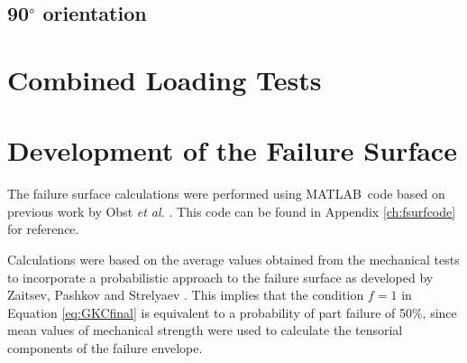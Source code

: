 \documentclass[main.tex]{subfiles}
\begin{document}
\subsection{90$^\circ$ orientation} \label{ssec:90r}
\section{Combined Loading Tests} \label{sec:clr}
\section{Development of the Failure Surface} \label{sec:fsc}

The failure surface calculations were performed using MATLAB\textregistered~code based on previous work by Obst \emph{et al.} \cite{Obst2018}. This code can be found in Appendix \ref{ch:fsurfcode} for reference.

Calculations were based on the average values obtained from the mechanical tests to incorporate a probabilistic approach to the failure surface as developed by Zaitsev, Pashkov and Strelyaev \cite{Zaitsev1975}. This implies that the condition $f=1$ in Equation \ref{eq:GKCfinal} is equivalent to a probability of part failure of 50\%, since mean values of mechanical strength were used to calculate the tensorial components of the failure envelope.  

% 

\end{document}

